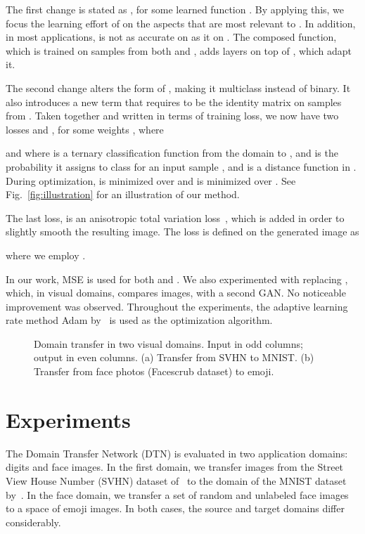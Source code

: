 \documentclass{article} \usepackage{iclr2017_conference,times}
\begin{document}
The first change is stated as , for some learned function . By applying this, we focus the learning effort of  on the aspects that are most relevant to . In addition, in most applications,  is not as accurate on  as it on . The composed function, which is trained on samples from both  and ,  adds layers on top of , which adapt it. 

The second change alters the form of , making it multiclass instead of binary. It also introduces a new term  that requires  to be the identity matrix on samples from . Taken together and written in terms of training loss, we now have two losses  and , for some weights , where





and where  is a ternary classification function from the domain  to , and  is the probability it assigns to class  for an input sample , and  is a distance function in . During optimization,  is minimized over  and  is minimized over . See Fig.~\ref{fig:illustration} for an illustration of our method.

The last loss,  is an anisotropic total variation loss~\citep{TV,Mahendran15}, which is added in order to slightly smooth the resulting image. The loss is defined on the generated image  as 

where we employ .

In our work, MSE is used for both  and . We also experimented with replacing , which, in visual domains, compares images, with a second GAN. No noticeable improvement was observed. Throughout the experiments, the adaptive learning rate method Adam by~\citet{adam} is used as the optimization algorithm. 

\begin{figure}[t]
\centering
{}
\caption{\label{fig:svnhmnistsamples}Domain transfer in two visual domains. Input in odd columns; output in even columns. (a) Transfer from SVHN to MNIST. (b) Transfer from face photos (Facescrub dataset) to emoji.}
\end{figure}

\section{Experiments}
\label{sec:expa}

The Domain Transfer Network (DTN) is evaluated in two application domains: digits and face images. In the first domain, we transfer images from the Street View House Number (SVHN) dataset of~\cite{svhn} to the domain of the MNIST dataset by~\cite{mnist}. In the face domain, we transfer a set of random and unlabeled face images to a space of emoji images. In both cases, the source and target domains differ considerably.
\end{document}
